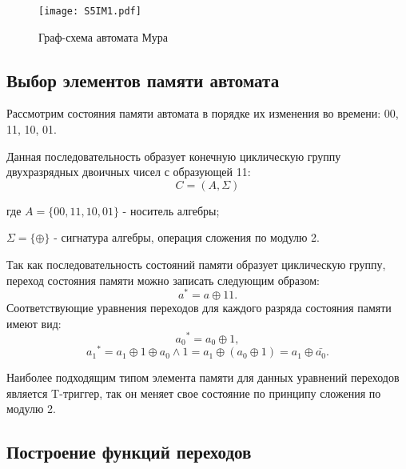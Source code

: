 \begin{figure}[h!]
    \centering
    \texttt{[image: S5IM1.pdf]}
    \caption{Граф-схема автомата Мура}
    \label{fig:task5:graph}
\end{figure}

\subsection{Выбор элементов памяти автомата}

Рассмотрим состояния памяти автомата в порядке их изменения во времени: 00, 11, 10, 01.

Данная последовательность образует конечную циклическую группу двухразрядных двоичных чисел
с образующей 11:
%
\begin{equation*}
    C = (A, \Sigma)
\end{equation*}

\begin{explanation}
    \item[где] $A = \{00, 11, 10, 01\}$ - носитель алгебры;
    \item $\Sigma = \{\oplus\}$ - сигнатура алгебры, операция сложения по модулю 2.
\end{explanation}

\vspace{1em}

Так как последовательность состояний памяти образует циклическую группу, 
переход состояния памяти можно записать следующим образом:
%
\begin{equation*}
    a^{*} = a \oplus 11.
\end{equation*}
%
Соответствующие уравнения переходов для каждого разряда состояния памяти имеют вид:
%
\begin{equation*}
    {a_0}^{*} = {a_0} \oplus 1,
\end{equation*}
%
\begin{equation*}
    {a_1}^{*} = {a_1} \oplus 1 \oplus {a_0} \wedge 1 = {a_1} \oplus (a_0 \oplus 1) = {a_1} \oplus \bar{a_0}.
\end{equation*}

Наиболее подходящим типом элемента памяти для данных уравнений переходов является T-триггер, 
так он меняет свое состояние по принципу сложения по модулю 2.

\subsection{Построение функций переходов}

